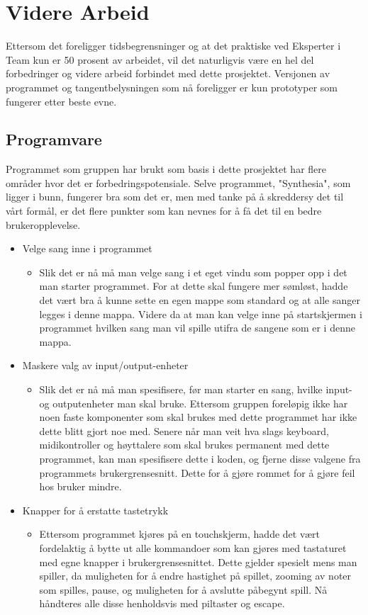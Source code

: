 \chapter{Videre Arbeid}
Ettersom det foreligger tidsbegrensninger og at det praktiske ved Eksperter i Team kun er 50 prosent av arbeidet, vil det naturligvis være en hel del forbedringer og videre arbeid forbindet med dette prosjektet. Versjonen av programmet og tangentbelysningen som nå foreligger er kun prototyper som fungerer etter beste evne. 

\section{Programvare}
Programmet som gruppen har brukt som basis i dette prosjektet har flere områder hvor det er forbedringspotensiale. Selve programmet, "Synthesia", som ligger i bunn, fungerer bra som det er, men med tanke på å skreddersy det til vårt formål, er det flere punkter som kan nevnes for å få det til en bedre brukeropplevelse.
\begin{itemize}

\item{Velge sang inne i programmet}
\begin{itemize}
\item{Slik det er nå må man velge sang i et eget vindu som popper opp i det man starter programmet. For at dette skal fungere mer sømløst, hadde det vært bra å kunne sette en egen mappe som standard og at alle sanger legges i denne mappa. Videre da at man kan velge inne på startskjermen i programmet hvilken sang man vil spille utifra de sangene som er i denne mappa.}
\end{itemize}

\item{Maskere valg av input/output-enheter}
\begin{itemize}
\item{Slik det er nå må man spesifisere, før man starter en sang, hvilke input- og outputenheter man skal bruke. Ettersom gruppen foreløpig ikke har noen faste komponenter som skal brukes med dette programmet har ikke dette blitt gjort noe med. Senere når man veit hva slags keyboard, midikontroller og høyttalere som skal brukes permanent med dette programmet, kan man spesifisere dette i koden, og fjerne disse valgene fra programmets brukergrensesnitt. Dette for å gjøre rommet for å gjøre feil hos bruker mindre.}
\end{itemize}

\item{Knapper for å erstatte tastetrykk}
\begin{itemize}
\item{Ettersom programmet kjøres på en touchskjerm, hadde det vært fordelaktig å bytte ut alle kommandoer som kan gjøres med tastaturet med egne knapper i brukergrensesnittet. Dette gjelder spesielt mens man spiller, da muligheten for å endre hastighet på spillet, zooming av noter som spilles, pause, og muligheten for å avslutte påbegynt spill. Nå håndteres alle disse henholdsvis med piltaster og escape.}
\end{itemize}

\end{itemize}


